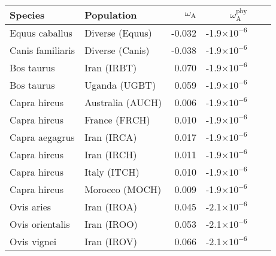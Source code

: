 \documentclass{article}
\begin{document}
    \begin{table*}[!ht]
        \centering
        \begin{adjustbox}{width = 1\textwidth}
            \small
            \begin{tabular}{|l|l|r|r|r|r|}
                \toprule
                Species             & Population                     & $\omega_{\mathrm{A}}$ & $\omega_{\mathrm{A}}^{\mathrm{phy}}$ \\
                \midrule
                Equus caballus      & Diverse (Equus)                & -0.032                & -1.9$\times 10^{-6}$                 \\
                Canis familiaris    & Diverse (Canis)                & -0.038                & -1.9$\times 10^{-6}$                 \\
                Bos taurus          & Iran (IRBT)                    & 0.070                 & -1.9$\times 10^{-6}$                 \\
                Bos taurus          & Uganda (UGBT)                  & 0.059                 & -1.9$\times 10^{-6}$                 \\
                Capra hircus        & Australia (AUCH)               & 0.006                 & -1.9$\times 10^{-6}$                 \\
                Capra hircus        & France (FRCH)                  & 0.010                 & -1.9$\times 10^{-6}$                 \\
                Capra aegagrus      & Iran (IRCA)                    & 0.017                 & -1.9$\times 10^{-6}$                 \\
                Capra hircus        & Iran (IRCH)                    & 0.011                 & -1.9$\times 10^{-6}$                 \\
                Capra hircus        & Italy (ITCH)                   & 0.010                 & -1.9$\times 10^{-6}$                 \\
                Capra hircus        & Morocco (MOCH)                 & 0.009                 & -1.9$\times 10^{-6}$                 \\
                Ovis aries          & Iran (IROA)                    & 0.045                 & -2.1$\times 10^{-6}$                 \\
                Ovis orientalis     & Iran (IROO)                    & 0.053                 & -2.1$\times 10^{-6}$                 \\
                Ovis vignei         & Iran (IROV)                    & 0.066                 & -2.1$\times 10^{-6}$                 \\

\end{tabular}
\end{adjustbox}
\end{table*}
\end{document}
